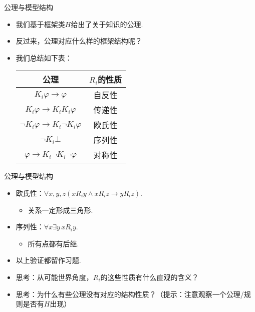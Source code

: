 \begin{frame}{公理与模型结构}
\begin{itemize}
    \item 我们基于框架类$H$给出了关于知识的公理.
    \item 反过来，公理对应什么样的框架结构呢？
    \item 我们总结如下表：
    \begin{table}[ht]
        \centering
       \begin{tabular}{cc}
\toprule 公理 &  $R_i$的性质 \\
\midrule $K_i \varphi \to \varphi$ & 自反性 \\
$K_i \varphi \to K_i K_i \varphi$ & 传递性 \\
$\neg K_i \varphi \to K_i \neg K_i \varphi$ & 欧氏性 \\
$\neg K_i\bot$  & 序列性\\
$\varphi \to K_i \neg K_i \neg \varphi$ & 对称性 \\
\bottomrule
\end{tabular}
    \end{table}
\end{itemize}
\end{frame}

\begin{frame}{公理与模型结构}
\begin{itemize}
    \item 欧氏性：$\forall x,y,z(xR_iy\wedge xR_iz\to yR_iz)$.
    \begin{itemize}
        \item 关系一定形成三角形.
    \end{itemize}
    \item 序列性：$\forall x\exists y\, xR_iy$.
    \begin{itemize}
        \item 所有点都有后继.
    \end{itemize}
    \item 以上验证都留作习题. %
    \item 思考：从可能世界角度，$R_i$的这些性质有什么直观的含义？
    \item 思考：为什么有些公理没有对应的结构性质？（提示：注意观察一个公理/规则是否有$H$出现）
\end{itemize}
\end{frame}

